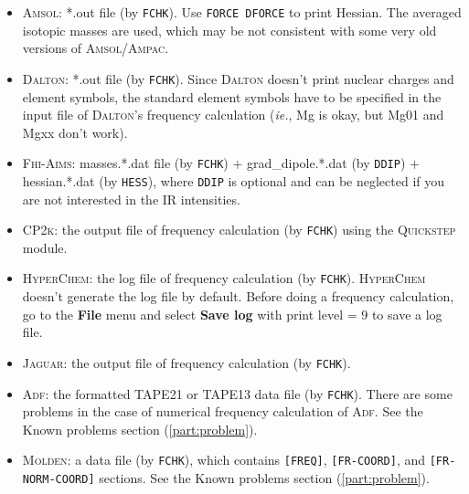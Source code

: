 \documentclass[12pt,english]{extarticle}
\begin{document}
\begin{itemize}
\item \textsc{Amsol}: *.out file (by \verb|FCHK|). Use \texttt{FORCE DFORCE} to print
Hessian. The averaged isotopic masses are used, which may be not
consistent with some very old versions of \textsc{Amsol/Ampac}.
\item \textsc{Dalton}: *.out file (by \verb|FCHK|). Since \textsc{Dalton} doesn't print nuclear
charges and element symbols, the standard element symbols have to be
specified in the input file of \textsc{Dalton}'s frequency calculation (\emph{ie.}, Mg is
okay, but Mg01 and Mgxx don't work).
\item \textsc{Fhi-Aims}: masses.*.dat file (by \verb|FCHK|) + grad{\_}dipole.*.dat (by
\verb|DDIP|) + hessian.*.dat (by \verb|HESS|), where \verb|DDIP| is
optional and can be neglected if you are not interested in the IR
intensities.
\item \textsc{CP2k}: the output file of frequency calculation (by \verb|FCHK|) using the
\textsc{Quickstep} module.
\item \textsc{HyperChem}: the log file of frequency calculation (by \verb|FCHK|).
\textsc{HyperChem} doesn't generate the log file by default. Before doing a frequency
calculation, go to the \textbf{File} menu and select \textbf{Save log} with print level = 9 to save a
log file.
\item \textsc{Jaguar}: the output file of frequency calculation (by \verb|FCHK|).
\item \textsc{Adf}: the formatted TAPE21 or TAPE13 data file (by \verb|FCHK|). There are
some problems in the case of numerical frequency calculation of \textsc{Adf}. See the
Known problems section (\ref{part:problem}).
\item \textsc{Molden}: a data file (by \verb|FCHK|), which contains \verb|[FREQ]|,
\verb|[FR-COORD]|, and \verb|[FR-NORM-COORD]| sections.
See the Known problems section (\ref{part:problem}).

\end{itemize}
\end{document}
